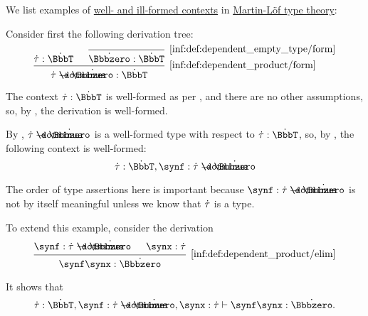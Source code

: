 \begin{example}\label{ex:def:mltt_well_formed_context}
  We list examples of \hyperref[def:mltt_well_formed_context]{well- and ill-formed contexts} in \hyperref[def:mltt]{Martin-L\"of type theory}:

  \begin{thmenum}
     Consider first the following derivation tree:
    \begin{equation*}
      \begin{prooftree}
        \hypo{ \syn\tau: \syn\BbbT }
        \infer0[\ref{inf:def:dependent_empty_type/form}]{ \syn\Bbbzero: \syn\BbbT }
        \infer2[\ref{inf:def:dependent_product/form}]{ \syn\tau \synimplies \syn\Bbbzero: \syn\BbbT }
      \end{prooftree}
    \end{equation*}

    The context \( \syn\tau: \syn\BbbT \) is well-formed as per , and there are no other assumptions, so, by , the derivation is well-formed.

    By , \( \syn\tau \synimplies \syn\Bbbzero \) is a well-formed type with respect to \( \syn\tau: \syn\BbbT \), so, by , the following context is well-formed:
    \begin{equation*}
      \syn\tau: \syn\BbbT, \synf: \syn\tau \synimplies \syn\Bbbzero
    \end{equation*}

    The order of type assertions here is important because \( \synf: \syn\tau \synimplies \syn\Bbbzero \) is not by itself meaningful unless we know that \( \dot{\tau} \) is a type.

    To extend this example, consider the derivation
    \begin{equation*}
      \begin{prooftree}
        \hypo{ \synf: \syn\tau \synimplies \syn\Bbbzero }
        \hypo{ \synx: \syn\tau }
        \infer2[\ref{inf:def:dependent_product/elim}]{ \synf \synx: \syn\Bbbzero }
      \end{prooftree}
    \end{equation*}

    It shows that
    \begin{equation*}
      \syn\tau: \syn\BbbT, \synf: \syn\tau \synimplies \syn\Bbbzero, \synx: \syn\tau \vdash \synf \synx: \syn\Bbbzero.
    \end{equation*}


\end{thmenum}
\end{example}

